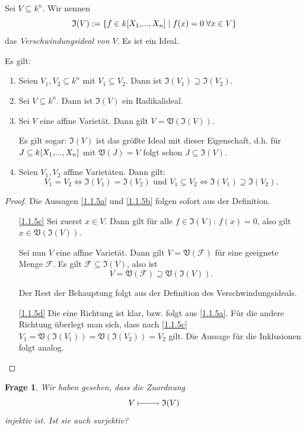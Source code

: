 \documentclass[a4paper,12pt]{scrbook}
\newtheorem{q}{Frage}
\newtheorem{proof}{Beweis}
\def\V{\mathfrak{V}}
\def\I{\mathfrak{I}}
\newcommand{\F}{\mathcal{F}}
\renewcommand{\dotsc}{\ensuremath{\!...}}
\renewcommand{\mapsto}{\raisebox{-1pt}{\tikz{\draw[thin,shorten >=3pt, |->] (0,0) node{\hspace*{0pt}} -- node{} (1,0);}}\penalty1000\relax}
\newcommand{\polyx}[1][n]{\ensuremath%
  [X_{1},\dotsc,X_{#1}]}
\begin{document}
\begin{db}
Sei $V\subseteq k^{n}$. Wir nennen
\[\I(V):=\{f\in k\polyx\mid f(x)=0\;\forall x\in V\}\]
das \emph{Verschwindungsideal von $V$}. Es ist ein Ideal.
\end{db}

\begin{bem}\label{1.1.5} Es gilt:
\begin{enumerate}
\item{} Seien $V_{1},V_{2}\subseteq k^{n}$ mit $V_{1}\subseteq V_{2}$. Dann ist $\I(V_{1})\supseteq \I(V_{2})$.
\item{} Sei $V\subseteq k^{n}$. Dann ist $\I(V)$ ein Radikalideal.
\item{} Sei $V$ eine affine Varietät. Dann gilt $V=\V(\I(V))$.

Es gilt sogar: $\I(V)$ ist das größte Ideal mit dieser Eigenschaft, d.h. für $J\subseteq k\polyx$ mit $\V(J)=V$ folgt schon $J\subseteq \I(V)$.
\item{} Seien $V_{1},V_{2}$ affine Varietäten. Dann gilt:
\[V_{1}=V_{2}\iff \I(V_{1})=\I(V_{2})\text{ und } V_{1}\subseteq V_{2}\iff \I(V_{1})\supseteq \I(V_{2}).\]
\end{enumerate}
\end{bem}

\begin{proof} Die Aussagen \ref{1.1.5a} und \ref{1.1.5b} folgen sofort aus der Definition.
\begin{enumerate}
\item[\ref{1.1.5c}] Sei zuerst $x\in V$. Dann gilt für alle $f\in \I(V)$: $f(x)=0$, also gilt $x\in \V(\I(V))$.

Sei nun $V$ eine affine Varietät. Dann gilt $V=\V(\F)$ für eine geeignete Menge $\F$. Es gilt $\F\subseteq \I(V)$, also ist
\[V=\V(\F)\supseteq \V(\I(V)).\]

Der Rest der Behauptung folgt aus der Definition des Verschwindungsideals.
\item[\ref{1.1.5d}] Die eine Richtung ist klar, bzw. folgt aus \ref{1.1.5a}. Für die andere Richtung überlegt man sich, dass nach \ref{1.1.5c} $V_{1}=\V(\I(V_{1}))=\V(\I(V_{2}))=V_{2}$ gilt.  Die Aussage für die Inklusionen folgt analog.
\end{enumerate}
\end{proof}

\begin{q}
Wir haben gesehen, dass die Zuordnung
\[V\mapsto \I(V)\]
injektiv ist. Ist sie auch surjektiv?
\end{q}
\end{document}
